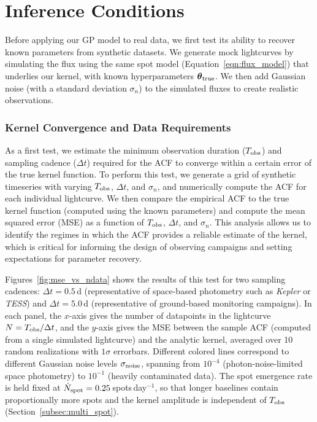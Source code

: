 \documentclass[preprint]{aastex702}
\begin{document}
\section{Inference Conditions} \label{sec:inference_conditions}

Before applying our GP model to real data, we first test its ability to recover known parameters from synthetic datasets. We generate mock lightcurves by simulating the flux using the same spot model (Equation~\ref{eqn:flux_model}) that underlies our kernel, with known hyperparameters $\boldsymbol{\theta}_{\rm true}$. We then add Gaussian noise (with a standard deviation $\sigma_n$) to the simulated fluxes to create realistic observations. 


\subsubsection{Kernel Convergence and Data Requirements}

As a first test, we estimate the minimum observation duration ($T_{\rm obs}$) and sampling cadence ($\Delta t$) required for the ACF to converge within a certain error of the true kernel function. To perform this test, we generate a grid of synthetic timeseries with varying $T_{\rm obs}$, $\Delta t$, and $\sigma_n$, and numerically compute the ACF for each individual lightcurve. We then compare the empirical ACF to the true kernel function (computed using the known parameters) and compute the mean squared error (MSE) as a function of $T_{\rm obs}$, $\Delta t$, and $\sigma_n$. This analysis allows us to identify the regimes in which the ACF provides a reliable estimate of the kernel, which is critical for informing the design of observing campaigns and setting expectations for parameter recovery.

Figures~\ref{fig:mse_vs_ndata} shows the results of this test for two sampling cadences: $\Delta t = 0.5$\,d (representative of space-based photometry such as \textit{Kepler} or \textit{TESS}) and $\Delta t = 5.0$\,d (representative of ground-based monitoring campaigns). In each panel, the $x$-axis gives the number of datapoints in the lightcurve $N = T_{\rm obs}/\Delta t$, and the $y$-axis gives the MSE between the sample ACF (computed from a single simulated lightcurve) and the analytic kernel, averaged over 10 random realizations with $1\sigma$ errorbars. Different colored lines correspond to different Gaussian noise levels $\sigma_{\rm noise}$, spanning from $10^{-4}$ (photon-noise-limited space photometry) to $10^{-1}$ (heavily contaminated data). The spot emergence rate is held fixed at $\dot{N}_{\rm spot} = 0.25$\,spots\,day$^{-1}$, so that longer baselines contain proportionally more spots and the kernel amplitude is independent of $T_{\rm obs}$ (Section~\ref{subsec:multi_spot}).
\end{document}
